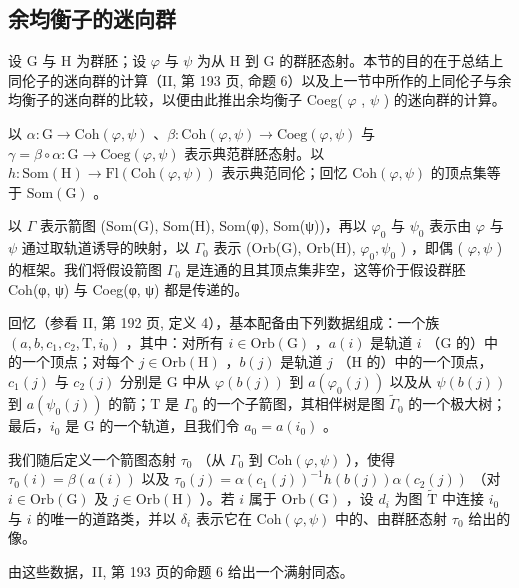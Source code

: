 \subsection{余均衡子的迷向群}

设 G 与 H 为群胚；设 \(\varphi\) 与 \(\psi\) 为从 H 到 G 的群胚态射。本节的目的在于总结上同伦子的迷向群的计算（II, 第 193 页, 命题 6）以及上一节中所作的上同伦子与余均衡子的迷向群的比较，以便由此推出余均衡子 Coeg( \(\varphi\) , \(\psi\) ) 的迷向群的计算。

以 \(\alpha\colon\mathrm{G}\to\mathrm{Coh}(\varphi,\psi)\) 、\(\beta\colon\mathrm{Coh}(\varphi,\psi)\to\mathrm{Coeg}(\varphi,\psi)\) 与 \(\gamma=\beta\circ\alpha\colon\mathrm{G}\to\mathrm{Coeg}(\varphi,\psi)\) 表示典范群胚态射。以 \(h\colon\mathrm{Som}(\mathrm{H})\to\mathrm{Fl}(\mathrm{Coh}(\varphi,\psi))\) 表示典范同伦；回忆 \(\mathrm{Coh}(\varphi,\psi)\) 的顶点集等于 \(\mathrm{Som}(\mathrm{G})\) 。

以 \(\Gamma\) 表示箭图 (Som(G), Som(H), Som(φ), Som(ψ))，再以 \(\varphi_0\) 与 \(\psi_0\) 表示由 \(\varphi\) 与 \(\psi\) 通过取轨道诱导的映射，以 \(\Gamma_0\) 表示 (Orb(G), Orb(H), \(\varphi_0, \psi_0\) ) ，即偶 ( \(\varphi, \psi\) ) 的框架。我们将假设箭图 \(\Gamma_0\) 是连通的且其顶点集非空，这等价于假设群胚 Coh(φ, ψ) 与 Coeg(φ, ψ) 都是传递的。

回忆（参看 II, 第 192 页, 定义 4），基本配备由下列数据组成：一个族 \((a, b, c_1, c_2, \mathrm{T}, i_0)\) ，其中：对所有 \(i \in \mathrm{Orb}(\mathrm{G})\) ，\(a(i)\) 是轨道 \(i\) （\(\mathrm{G}\) 的）中的一个顶点；对每个 \(j \in \mathrm{Orb}(\mathrm{H})\) ，\(b(j)\) 是轨道 \(j\) （\(\mathrm{H}\) 的）中的一个顶点，\(c_1(j)\) 与 \(c_2(j)\) 分别是 \(\mathrm{G}\) 中从 \(\varphi(b(j))\) 到 \(a(\varphi_0(j))\) 以及从 \(\psi(b(j))\) 到 \(a(\psi_0(j))\) 的箭；\(\mathrm{T}\) 是 \(\Gamma_0\) 的一个子箭图，其相伴树是图 \(\widetilde{\Gamma}_0\) 的一个极大树；最后，\(i_0\) 是 \(\mathrm{G}\) 的一个轨道，且我们令 \(a_0 = a(i_0)\) 。

我们随后定义一个箭图态射 \(\tau_0\) （从 \(\Gamma_0\) 到 \(\mathrm{Coh}(\varphi, \psi)\) ），使得 \(\tau_0(i) = \beta(a(i))\) 以及 \(\tau_0(j) = \alpha(c_1(j))^{-1}h(b(j))\alpha(c_2(j))\) （对 \(i \in \mathrm{Orb}(\mathrm{G})\) 及 \(j \in \mathrm{Orb}(\mathrm{H})\) ）。若 \(i\) 属于 \(\mathrm{Orb}(\mathrm{G})\) ，设 \(d_i\) 为图 \(\widetilde{\mathrm{T}}\) 中连接 \(i_0\) 与 \(i\) 的唯一的道路类，并以 \(\delta_i\) 表示它在 \(\mathrm{Coh}(\varphi, \psi)\) 中的、由群胚态射 \(\tau_0\) 给出的像。

由这些数据，II, 第 193 页的命题 6 给出一个满射同态。

